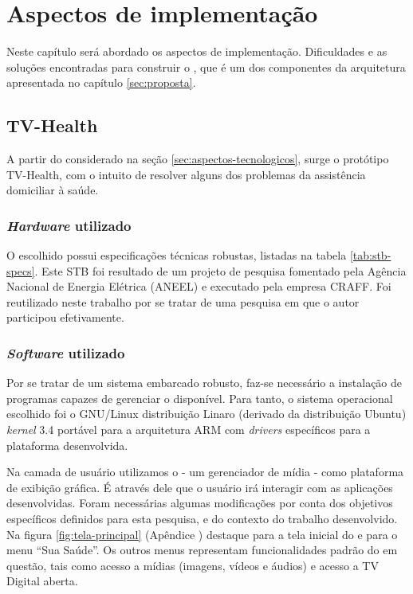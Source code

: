 \chapter{Aspectos de implementação}\label{cap:aspectos-de-implementacao}

Neste capítulo será abordado os aspectos de implementação. Dificuldades e as
soluções encontradas para construir o \software, que é um dos componentes
da arquitetura apresentada no capítulo \vref{sec:proposta}.

\section{TV-Health} \label{sec:tv-health} 

A partir do considerado na seção \ref{sec:aspectos-tecnologicos}, surge o
protótipo TV-Health, com o intuito de resolver alguns dos problemas da
assistência domiciliar à saúde.

\subsection{\textit{Hardware} utilizado}

O \stb[] escolhido possui especificações técnicas robustas, listadas na 
tabela \ref{tab:stb-specs}. Este STB foi resultado de um projeto de pesquisa
fomentado pela Agência Nacional de Energia Elétrica (ANEEL) e executado pela
empresa CRAFF. Foi reutilizado neste trabalho por se tratar de 
uma pesquisa em que o autor participou efetivamente.


\subsection{\textit{Software} utilizado}

Por se tratar de um sistema embarcado robusto, faz-se necessário a instalação
de programas capazes de gerenciar o \hardware[] disponível. Para tanto, o
sistema operacional escolhido foi o GNU/Linux distribuição Linaro (derivado da
distribuição Ubuntu) \textit{kernel} 3.4 portável para a arquitetura 
ARM com \textit{drivers} específicos para a plataforma desenvolvida.


Na camada de usuário utilizamos o \software[] \xbmc[] - um gerenciador de mídia
- como plataforma de exibição gráfica. É através dele que o usuário irá 
interagir com as aplicações desenvolvidas. Foram necessárias algumas 
modificações por conta dos objetivos específicos definidos para esta pesquisa,
e do contexto do trabalho desenvolvido. Na figura \ref{fig:tela-principal}
(Apêndice )
destaque para a tela inicial do \software[] \xbmc[] e para o menu ``Sua Saúde''.
Os outros menus representam funcionalidades padrão do \software[] em questão,
tais como acesso a mídias (imagens, vídeos e áudios) e acesso a TV Digital aberta.

